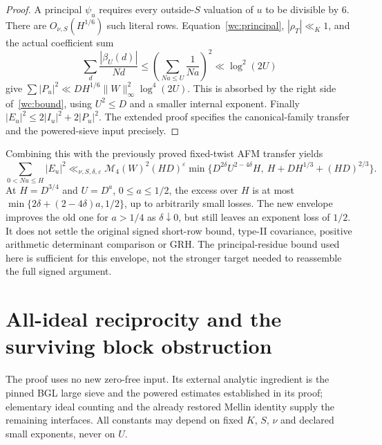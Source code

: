 \documentclass[11pt]{article}
\theoremstyle{definition}\newtheorem{definition}[theorem]{Definition}
\theoremstyle{remark}\newtheorem{remark}[theorem]{Remark}
\begin{document}
\begin{proof}
A principal $\psi_u$ requires every outside-$S$ valuation of $u$ to
be divisible by $6$. There are $O_{\nu,S}(H^{1/6})$ such literal
rows. Equation~\eqref{wc:principal}, $|\rho_T|\ll_K1$, and the actual
coefficient sum
\[
 \sum_d\frac{|\beta_U(d)|}{Nd}
 \le\left(\sum_{Na\le U}\frac1{Na}\right)^2\ll\log^2(2U)
\]
give $\sum|P_u|^2\ll DH^{1/6}\|W\|_\infty^2\log^4(2U)$.
This is absorbed by the right side of~\eqref{wc:bound}, using
$U^2\le D$ and a smaller internal exponent. Finally
$|E_u|^2\le2|I_u|^2+2|P_u|^2$. The extended proof specifies the
canonical-family transfer and the powered-sieve input precisely.
\end{proof}

Combining this with the previously proved fixed-twist AFM transfer yields
\begin{equation}\label{wc:minimum}
 \sum_{0<Nu\le H}|E_u|^2\ll_{\nu,S,\delta,\varepsilon}
 \mathcal M_4(W)^2(HD)^\varepsilon
 \min\{D^{2\delta}U^{2-4\delta}H,\ H+DH^{1/3}+(HD)^{2/3}\}.
\end{equation}
At $H=D^{3/4}$ and $U=D^a$, $0\le a\le1/2$, the excess over $H$
is at most $\min\{2\delta+(2-4\delta)a,1/2\}$, up to arbitrarily
small losses. The new envelope improves the old one for $a>1/4$ as
$\delta\downarrow0$, but still leaves an exponent loss of $1/2$.
It does not settle the original signed short-row bound, type-II covariance,
positive arithmetic determinant comparison or GRH. The principal-residue
bound used here is sufficient for this envelope, not the stronger target
needed to reassemble the full signed argument.

\section{All-ideal reciprocity and the surviving block obstruction}
\label{wc:details}
The proof uses no new zero-free input. Its external analytic ingredient
is the pinned BGL large sieve and the powered estimates established in
its proof; elementary ideal counting and the already restored Mellin
identity supply the remaining interfaces. All constants may depend on
fixed $K$, $S$, $\nu$ and declared small exponents, never on $U$.
\end{document}
